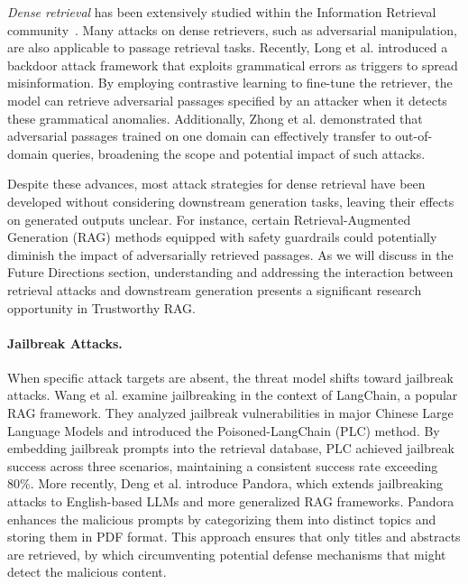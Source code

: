 \textit{Dense retrieval} has been extensively studied within the Information Retrieval community~\cite{densesurvey2024}. Many attacks on dense retrievers, such as adversarial manipulation, are also applicable to passage retrieval tasks. Recently, Long et al.\cite{long2024backdoorattacksdensepassage} introduced a backdoor attack framework that exploits grammatical errors as triggers to spread misinformation. By employing contrastive learning to fine-tune the retriever, the model can retrieve adversarial passages specified by an attacker when it detects these grammatical anomalies. Additionally, Zhong et al.\cite{zhong2023poisoningretrievalcorporainjecting} demonstrated that adversarial passages trained on one domain can effectively transfer to out-of-domain queries, broadening the scope and potential impact of such attacks.

Despite these advances, most attack strategies for dense retrieval have been developed without considering downstream generation tasks, leaving their effects on generated outputs unclear. For instance, certain Retrieval-Augmented Generation (RAG) methods equipped with safety guardrails could potentially diminish the impact of adversarially retrieved passages. As we will discuss in the Future Directions section, understanding and addressing the interaction between retrieval attacks and downstream generation presents a significant research opportunity in Trustworthy RAG. 

\paragraph{Jailbreak Attacks.} When specific attack targets are absent, the threat model shifts toward jailbreak attacks. Wang et al.\cite{wang2024poisonedlangchainjailbreakllms} examine jailbreaking in the context of LangChain, a popular RAG framework. They analyzed jailbreak vulnerabilities in major Chinese Large Language Models and introduced the Poisoned-LangChain (PLC) method. By embedding jailbreak prompts into the retrieval database, PLC achieved jailbreak success across three scenarios, maintaining a consistent success rate exceeding 80\%. More recently, Deng et al.\cite{deng2024pandorajailbreakgptsretrieval} introduce Pandora, which extends jailbreaking attacks to English-based LLMs and more generalized RAG frameworks. Pandora enhances the malicious prompts by categorizing them into distinct topics and storing them in PDF format. This approach ensures that only titles and abstracts are retrieved, by which circumventing potential defense mechanisms that might detect the malicious content.

